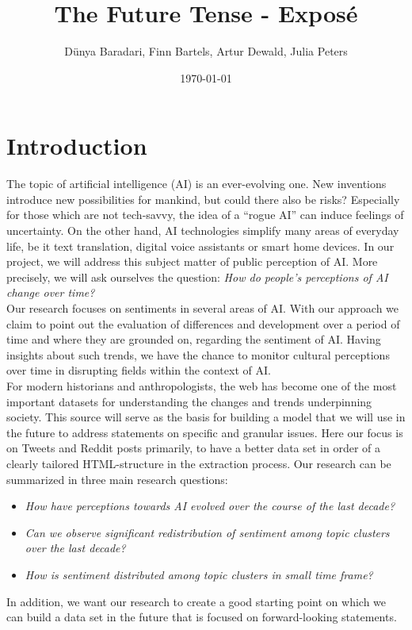 \documentclass[11pt]{article}
\title{The Future Tense - Exposé}
\author{Dünya Baradari, Finn Bartels, Artur Dewald, Julia Peters}
\date{\today}
\begin{document}
\maketitle
\thispagestyle{empty}


\section{Introduction}
The topic of artificial intelligence (AI) is an ever-evolving one.
New inventions introduce new possibilities for mankind, but could there also be risks?
Especially for those which are not tech-savvy, the idea of a “rogue AI” can induce feelings of uncertainty.
On the other hand, AI technologies simplify many areas of everyday life, be it text translation, digital voice assistants or smart home devices.
In our project, we will address this subject matter of public perception of AI.
More precisely, we will ask ourselves the question:
\textit{How do people’s perceptions of AI change over time?}
\\
Our research focuses on sentiments in several areas of AI.
With our approach we claim to point out the evaluation of differences and development over a period of time and where they are grounded on, regarding the sentiment of AI.
Having insights about such trends, we have the chance to monitor cultural perceptions over time in disrupting fields within the context of AI.
\\
For modern historians and anthropologists, the web has become one of the most important datasets for understanding the changes and trends underpinning society.
This source will serve as the basis for building a model that we will use in the future to address statements on specific and granular issues.
Here our focus is on Tweets and Reddit posts primarily, to have a better data set in order of a clearly tailored HTML-structure in the extraction process.
Our research can be summarized in three main research questions:

\begin{itemize}
\item \textit{How have perceptions towards AI evolved over the course of the last decade?}
\item \textit{Can we observe significant redistribution of sentiment among topic clusters over the last decade?}
\item \textit{How is sentiment distributed among topic clusters in small time frame?}
\end{itemize}
%
In addition, we want our research to create a good starting point on which we can build a data set in the future that is focused on forward-looking statements.
\end{document}
